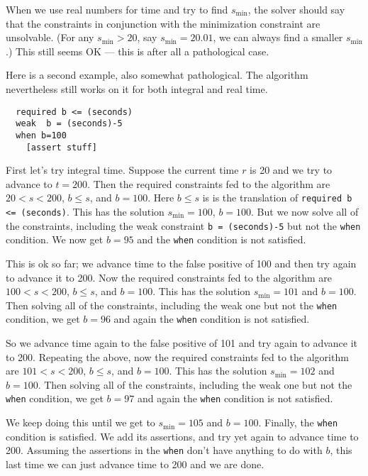 \documentclass{article}
\begin{document}
When we use real numbers for time and try to find $s_{\min}$, the
solver should say that the constraints in conjunction with the
minimization constraint are unsolvable.  (For any $s_{\min}>20$, say
$s_{\min}=20.01$, we can always find a smaller $s_{\min}$.)  This
still seems OK --- this is after all a pathological case.

Here is a second example, also somewhat pathological.  The algorithm
nevertheless still works on it for both integral and real time.

\begin{verbatim}
  required b <= (seconds)
  weak  b = (seconds)-5
  when b=100
    [assert stuff]
\end{verbatim}

First let's try integral time.  Suppose the current time $r$ is 20 and
we try to advance to $t=200$.  Then the required constraints fed to
the algorithm are $20<s<200$, $b \leq s$, and $b=100$.  Here $b \leq
s$ is is the translation of \verb|required b <= (seconds)|.  This has
the solution $s_{\min}=100$, $b=100$.  But we now solve all of the
constraints, including the weak constraint \verb|b = (seconds)-5| but
not the \verb|when| condition.  We now get $b=95$ and the \verb|when|
condition is not satisfied.

This is ok so far; we advance time to the false positive of 100 and
then try again to advance it to 200.  Now the required constraints fed
to the algorithm are $100<s<200$, $b \leq s$, and $b=100$.  This has
the solution $s_{\min}=101$ and $b=100$. Then
solving all of the constraints, including the weak one but not the
\verb|when| condition, we get $b=96$ and again the \verb|when|
condition is not satisfied.

So we advance time again to the false positive of 101 and try again to
advance it to 200.  Repeating the above, now the required constraints fed
to the algorithm are $101<s<200$, $b \leq s$, and $b=100$.  This has
the solution $s_{\min}=102$ and $b=100$. Then
solving all of the constraints, including the weak one but not the
\verb|when| condition, we get $b=97$ and again the \verb|when|
condition is not satisfied.

We keep doing this until we get to $s_{\min}=105$ and $b=100$.
Finally, the \verb|when| condition is satisfied.  We add its
assertions, and try yet again to advance time to 200.  Assuming the
assertions in the \verb|when| don't have anything to do with $b$, this
last time we can just advance time to 200 and we are done.
\end{document}
